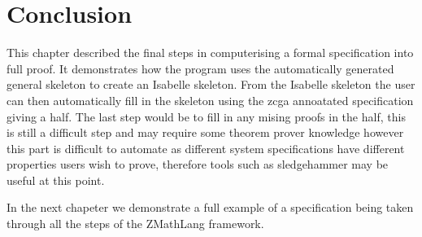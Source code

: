 \section{Conclusion}

This chapter described the final steps in computerising a formal specification
into full proof. It demonstrates how the program uses the automatically
generated general skeleton to  create an Isabelle skeleton. From the Isabelle
skeleton the user can then automatically fill in the skeleton using the
\gls{zcga} annoatated specification giving a \gls{half}. The last step would be
to fill in any mising proofs in the \gls{half}, this is still a difficult step
and may require some theorem prover knowledge however this part is difficult to
automate as different system specifications have different properties users wish
to prove, therefore tools such as sledgehammer \cite{sledgehammer} may be useful
at this point.

In the next chapeter we demonstrate a full example of a specification being
taken through all the steps of the ZMathLang framework.